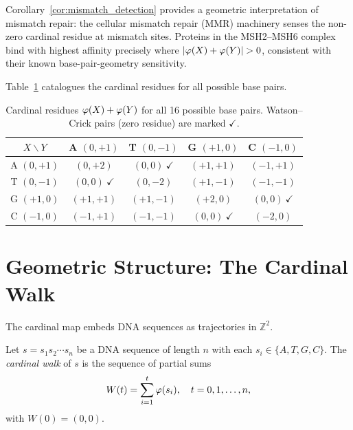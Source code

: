 \begin{remark}
Corollary~\ref{cor:mismatch_detection} provides a geometric interpretation
of mismatch repair: the cellular mismatch repair (MMR) machinery senses
the non-zero cardinal residue at mismatch sites. Proteins in the
MSH2--MSH6 complex bind with highest affinity precisely where
$|\varphi(X) + \varphi(Y)| > 0$, consistent with their known
base-pair-geometry sensitivity.
\end{remark}

Table~\ref{tab:cardinal_residues} catalogues the cardinal residues for all
possible base pairs.

\begin{table}[htbp]
\centering
\caption{Cardinal residues $\varphi(X) + \varphi(Y)$ for all 16 possible
base pairs. Watson--Crick pairs (zero residue) are marked $\checkmark$.}
\label{tab:cardinal_residues}
\small
\begin{tabular}{ccccc}
\toprule
$X \backslash Y$ & A $(0,+1)$ & T $(0,-1)$ & G $(+1,0)$ & C $(-1,0)$ \\
\midrule
A $(0,+1)$ & $(0,+2)$   & $(0,0)\ \checkmark$ & $(+1,+1)$ & $(-1,+1)$ \\
T $(0,-1)$ & $(0,0)\ \checkmark$ & $(0,-2)$ & $(+1,-1)$ & $(-1,-1)$ \\
G $(+1,0)$ & $(+1,+1)$  & $(+1,-1)$ & $(+2,0)$   & $(0,0)\ \checkmark$ \\
C $(-1,0)$ & $(-1,+1)$  & $(-1,-1)$ & $(0,0)\ \checkmark$ & $(-2,0)$ \\
\bottomrule
\end{tabular}
\end{table}

\section{Geometric Structure: The Cardinal Walk}
\label{sec:cardinal_walk}

The cardinal map embeds DNA sequences as trajectories in $\mathbb{Z}^2$.

\begin{definition}
\label{def:cardinal_walk}
Let $s = s_1 s_2 \cdots s_n$ be a DNA sequence of length $n$ with each
$s_i \in \{A,T,G,C\}$. The \emph{cardinal walk} of $s$ is the sequence
of partial sums
\begin{equation}
  W(t) = \sum_{i=1}^{t} \varphi(s_i), \quad t = 0, 1, \ldots, n,
  \label{eq:cardinal_walk}
\end{equation}
with $W(0) = (0,0)$.
\end{definition}

